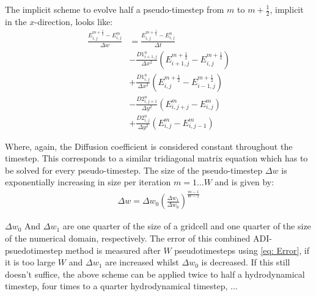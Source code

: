 The implicit scheme to evolve half a pseudo-timestep from $m$ to $m + \frac{1}{2}$, implicit in the $x$-direction, looks like:
\begin{align}
\frac{E_{i,j}^{m+\frac{1}{2}} - E_{i,j}^{m}}{\Delta w} 
 &= \frac{E_{i,j}^{m+\frac{1}{2}} - E_{i,j}^{n}}{\Delta t} \\
 &- \frac{D1_{i+1,j}^{n}}{\Delta x^2} (E_{i+1,j}^{m+\frac{1}{2}} - E_{i,j}^{m+\frac{1}{2}}) \\
 &+ \frac{D1_{i,j}^{n}}{\Delta x^2} (E_{i,j}^{m+\frac{1}{2}} - E_{i-1,j}^{m+\frac{1}{2}}) \\
 &- \frac{D2_{i,j+1}^{n}}{\Delta y^2} (E_{i,j+j}^{m} - E_{i,j}^{m}) \\
 &+ \frac{D2_{i,j}^{n}}{\Delta y^2} (E_{i,j}^{m} - E_{i,j-1}^{m})
\end{align}

Where, again, the Diffusion coefficient is considered constant throughout the timestep. This corresponds to a similar tridiagonal matrix equation which has to be solved for every pseudo-timestep. The size of the pseudo-timestep $\Delta w$ is exponentially increasing in size per iteration $m = 1 ... W$ and is given by:
\begin{align}
\Delta w = \Delta w_0 \left(\frac{\Delta w_1}{\Delta w_0} \right)^\frac{m-1}{W-1}
\end{align}

$\Delta w_0$ And $\Delta w_1$ are one quarter of the size of a gridcell and one quarter of the size of the numerical domain, respectively. The error of this combined ADI-psuedotimestep method is measured after $W$ pseudotimesteps using \eqref{eq: Error}, if it is too large $W$ and $\Delta w_1$ are increased whilst $\Delta w_0$ is decreased. If this still doesn't suffice, the above scheme can be applied twice to half a hydrodynamical timestep, four times to a quarter hydrodynamical timestep, ... 

